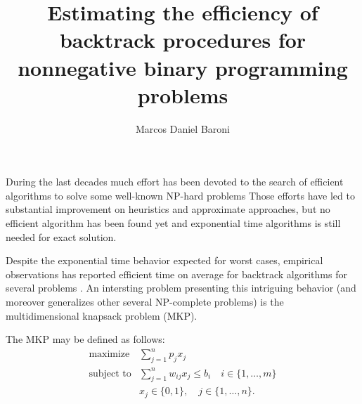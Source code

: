 \documentclass{article}
\title{Estimating the efficiency of backtrack procedures for nonnegative binary programming problems}
\author{Marcos Daniel Baroni}
\begin{document}
\maketitle




During the last decades much effort has been devoted to the search of
efficient algorithms to solve some well-known NP-hard problems
Those efforts have led to substantial improvement on heuristics and
approximate approaches, but no efficient algorithm has been found yet and
exponential time algorithms is still needed for exact solution.

Despite the exponential time behavior expected for worst cases, empirical
observations has reported efficient time on average for backtrack algorithms for
several problems \cite{cheeseman1991really, wilf1984backtrack,
posa1976hamiltonian, johnson1984np11, purdom1983search}.
An intersting problem presenting this intriguing behavior (and moreover
generalizes other several NP-complete problems) is the multidimensional knapsack
problem (MKP).

The MKP may be defined as follows:
\begin{align*}
  \text{maximize} & \sum_{j=1}^n p_j x_j \\
  \text{subject to} & \sum_{j=1}^n w_{ij} x_j \leq b_i \quad i \in \{1, \ldots, m\}\\
   & x_j \in \{0, 1\}, \quad j \in \{1, \ldots, n\}.
\end{align*}
\end{document}
